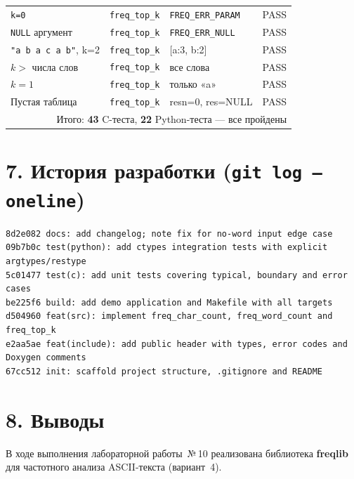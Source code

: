 \begin{center}
\begin{longtable}{p{4.2cm}|p{3.5cm}|p{3.2cm}|c}
\texttt{k=0}                     & \texttt{freq\_top\_k}      & \texttt{FREQ\_ERR\_PARAM} & PASS \\
\texttt{NULL} аргумент           & \texttt{freq\_top\_k}      & \texttt{FREQ\_ERR\_NULL}  & PASS \\
\texttt{"a b a c a b"}, k=2      & \texttt{freq\_top\_k}      & [a:3, b:2]                & PASS \\
$k >$ числа слов                 & \texttt{freq\_top\_k}      & все слова                 & PASS \\
$k=1$                            & \texttt{freq\_top\_k}      & только «a»                & PASS \\
Пустая таблица                   & \texttt{freq\_top\_k}      & resn=0, res=NULL          & PASS \\
\bottomrule
\multicolumn{4}{r}{\small Итого: \textbf{43} C-теста, \textbf{22} Python-теста --- все пройдены} \\
\end{longtable}
\end{center}

\HRule

\section*{7. История разработки (\texttt{git log --oneline})}

\begin{lstlisting}[style=Bashstyle]
8d2e082 docs: add changelog; note fix for no-word input edge case
09b7b0c test(python): add ctypes integration tests with explicit argtypes/restype
5c01477 test(c): add unit tests covering typical, boundary and error cases
be225f6 build: add demo application and Makefile with all targets
d504960 feat(src): implement freq_char_count, freq_word_count and freq_top_k
e2aa5ae feat(include): add public header with types, error codes and Doxygen comments
67cc512 init: scaffold project structure, .gitignore and README
\end{lstlisting}

\HRule

\section*{8. Выводы}

В ходе выполнения лабораторной работы~№\,10 реализована библиотека
\textbf{freqlib} для частотного анализа ASCII-текста (вариант~4).

